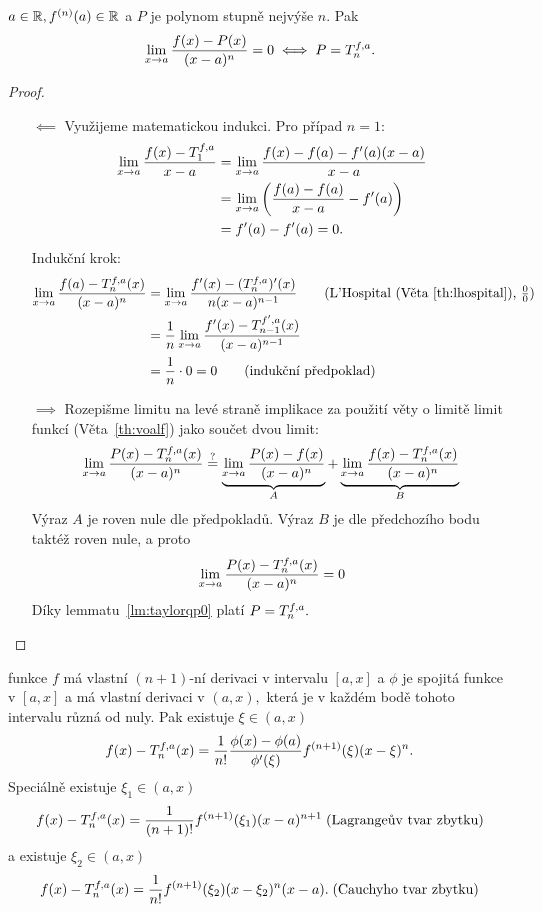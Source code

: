 \begin{theorem}
    \Necht $a \in \mathbb{R}, f^{(n)}(a) \in \mathbb{R}$ a $P$ je polynom stupně nejvýše $n.$ Pak
    $$\lim_{x \to a} \frac{f(x) - P(x)}{(x-a)^n} = 0 \iff P = T_n^{f,a}. $$
\end{theorem}

\begin{proof}
    \leavevmode
    \begin{itemize}
        \item[$\impliedby$]
            Využijeme matematickou indukci. Pro případ $n=1:$
            \begin{align*}
                \lim_{x \to a} \frac{f(x) - T^{f,a}_1}{x-a} 
                &= \lim_{x \to a} \frac{f(x) - f(a) - f'(a)(x-a)}{x-a} \\
                &= \lim_{x \to a} \left(\frac{f(a)-f(a)}{x-a} - f'(a)\right) \\
                &= f'(a) - f'(a) = 0.
            \end{align*}
            Indukční krok:
            \begin{align*}
                \limxa \frac{f(a) - \tfan(x)}{(x-a)^n}
                &= \limxa \frac{f'(x) - (\tfan)'(x)}{n(x-a)^{n-1}}
                    \tag{L'Hospital (Věta~\ref{th:lhospital}),
                    $\frac{0}{0}$} \\
                &= \frac{1}{n} \limxa \frac{f'(x) - T^{f',a}_{n-1}(x)}{(x-a)^{n-1}} \\
                &= \frac{1}{n}\cdot0 = 0\tag{indukční předpoklad}
            \end{align*}

        \item[$\implies$]
            Rozepišme limitu na levé straně implikace za použití věty 
            o limitě limit funkcí (Věta~\ref{th:voalf}) jako součet dvou limit:
            $$\lim_{x \to a} \frac{P(x) - T_n^{f,a}(x)}{(x-a)^n} 
            \stackrel{?}{=} \underbrace{\lim_{x \to a} \frac{P(x) - f(x)}{(x-a)^n}}_{A} 
                + \underbrace{\lim_{x \to a} \frac{f(x) - T_n^{f,a}(x)}{(x-a)^n}}_{B}$$
            Výraz $A$ je roven nule dle předpokladů. Výraz $B$ je dle předchozího
            bodu taktéž roven nule, a proto
            $$\lim_{x \to a} \frac{P(x) - T_n^{f,a}(x)}{(x-a)^n}  = 0$$
            Díky lemmatu~\ref{lm:taylorqp0} platí $P = T_n^{f,a}.$
    \end{itemize}
\end{proof}

\begin{theorem}
    \Necht funkce $f$ má vlastní $(n+1)$-ní derivaci v intervalu $[a,x]$ a \necht
    $\phi$ je spojitá funkce v $[a,x]$ a má vlastní derivaci v $(a,x),$ která je
    v každém bodě tohoto intervalu různá od nuly. Pak existuje $\xi \in (a,x)$ \tz
    $$f(x) - T_n^{f,a}(x) = \frac{1}{n!}\frac{\phi(x)-\phi(a)}{\phi'(\xi)}f^{(n+1)}(\xi)(x-\xi)^n.$$
    Speciálně existuje $\xi_1 \in (a,x)$ \tz
    $$f(x) - T_n^{f,a}(x) = \frac{1}{(n+1)!}f^{(n+1)}(\xi_1)(x-a)^{n+1} \; 
    \text{(Lagrangeův tvar zbytku)}$$
    a existuje $\xi_2 \in (a,x)$ \tz
    $$f(x) - T_n^{f,a}(x) = \frac{1}{n!}f^{(n+1)}(\xi_2)(x-\xi_2)^n(x-a). \;
    \text{(Cauchyho tvar zbytku)}$$
\end{theorem}


